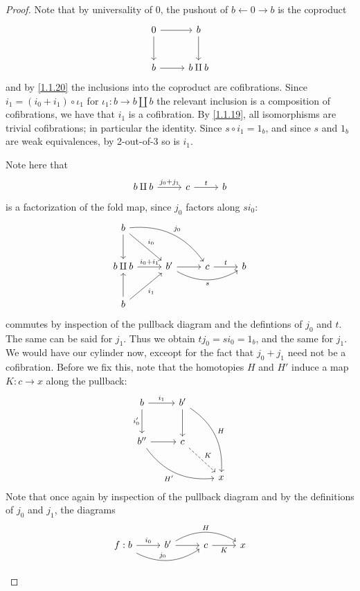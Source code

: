 \begin{proof}
	Note that by universality of $0$, the pushout of $b\leftarrow 0\rightarrow b$ is the coproduct
	\[\begin{tikzcd}[row sep = 2.5em, column sep = 2.5em]
	0 \ar[r] \ar[d]  & b \ar[d]  \\
	b \ar[r]  & b\amalg b
	\end{tikzcd}\]
	and by \cref{1.1.20} the inclusions into the coproduct are cofibrations. Since $i_1 = (i_0+i_1)\circ \iota_1$ for $\iota_1 : b \to b\amalg b$ the relevant inclusion is a composition of cofibrations, we have that $i_1$ is a cofibration. By \cref{1.1.19}, all isomorphisms are trivial cofibrations; in particular the identity. Since $s\circ i_1=1_b$, and since $s$ and $1_b$ are weak equivalences, by 2-out-of-3 so is $i_1$.

	Note here that
	\[\begin{tikzcd}[row sep = 2.5em, column sep = 2.5em]
	b\amalg b \ar[" j_0+j_1 ", r]  & c \ar[" t ", r]  & b
	\end{tikzcd}\]
	is a factorization of the fold map, since $j_0$ factors along $si_0$:
	\[\begin{tikzcd}[row sep = 2.5em, column sep = 2.5em]
	b \ar[d] \ar[" i_0 ", dr] \ar[" j_0 ", bend left, drr] &  &  &  \\
	b\amalg b \ar[" i_0+i_1 ", r]  & b' \ar[r] \ar[" s "', bend right, rr]  & c \ar[" t ", r]  & b \\
	b \ar[u] \ar[" i_1 "', ur] &  &  & 
	\end{tikzcd}\]
	commutes by inspection of the pullback diagram and the defintions of $j_0$ and $t$. The same can be said for $j_1$. Thus we obtain $tj_0=si_0=1_b$, and the same for $j_1$. We would have our cylinder now, exceopt for the fact that $j_0+j_1$ need not be a cofibration. Before we fix this, note that the homotopies $H$ and $H'$ induce a map $K : c \to x$ along the pullback:
	\[\begin{tikzcd}[row sep = 2.5em, column sep = 2.5em]
	b \ar[" i_1 ", r] \ar[" i_0' "', d]  & b' \ar[d] \ar[" H ", bend left, ddr] \\
	b''\ar[r] \ar[" H' "', bend right, drr] & c\ar[" K ", dashed, dr]\\
						& & x
	\end{tikzcd}\]
	Note that once again by inspection of the pullback diagram and by the definitions of $j_0$ and $j_1$, the diagrams
	\[\begin{tikzcd}[row sep = 1.5em, column sep = 2.5em]
	f:b \ar[" i_0 ", r] \ar[" j_0 ", bend right, rr]  & b' \ar[r] \ar[" H ", bend left, rr]  & c\ar[" K "', r]  & x \\

\end{tikzcd}\]
\end{proof}
